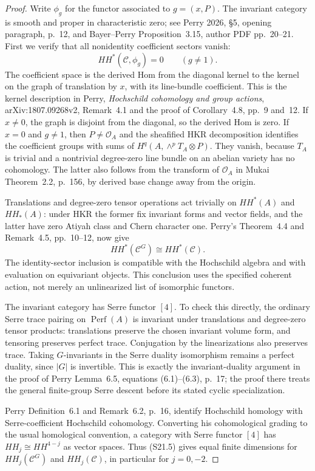 \documentclass[11pt,a4paper]{article}
\theoremstyle{definition}
\begin{document}
\begin{proof}
Write $\phi_g$ for the functor associated to $g=(x,P)$.
The invariant category is smooth and proper in characteristic
zero; see Perry 2026, \S5, opening paragraph, p.~12,
and Bayer--Perry Proposition~3.15, author PDF pp.~20--21.
First we verify that all nonidentity coefficient sectors vanish:
\[
 HH^*(\mathcal C,\phi_g)=0\qquad(g\ne1).
 \tag{S21.4}
\]
The coefficient space is the derived Hom from the diagonal
kernel to the kernel on the graph of translation by $x$,
with its line-bundle coefficient. This is the kernel
description in Perry, \emph{Hochschild cohomology and group
actions}, arXiv:1807.09268v2, Remark~4.1 and the proof of
Corollary~4.8, pp.~9 and~12. If $x\ne0$, the graph is
disjoint from the diagonal, so the derived Hom is zero.
If $x=0$ and $g\ne1$, then $P\ne\mathcal O_A$ and
the sheafified HKR decomposition identifies the coefficient
groups with sums of
$H^q(A,\wedge^pT_A\otimes P)$.
They vanish, because $T_A$ is trivial and a nontrivial
degree-zero line bundle on an abelian variety has no
cohomology. The latter also follows from the transform of
$\mathcal O_A$ in Mukai Theorem~2.2, p.~156, by derived
base change away from the origin.

Translations and degree-zero tensor operations act trivially
on $HH^*(A)$ and $HH_*(A)$: under HKR the former fix invariant
forms and vector fields, and the latter have zero Atiyah
class and Chern character one. Perry's Theorem~4.4 and
Remark~4.5, pp.~10--12, now give
\[
 HH^*(\mathcal C^G)\cong HH^*(\mathcal C).
 \tag{S21.5}
\]
The identity-sector inclusion is compatible with the
Hochschild algebra and with evaluation on equivariant objects.
This conclusion uses the specified coherent action, not
merely an unlinearized list of isomorphic functors.

The invariant category has Serre functor $[4]$.
To check this directly, the ordinary Serre trace pairing on
$\operatorname{Perf}(A)$ is invariant under translations
and degree-zero tensor products: translations preserve the
chosen invariant volume form, and tensoring preserves
perfect trace. Conjugation by the linearizations also
preserves trace. Taking $G$-invariants in the Serre duality
isomorphism remains a perfect duality, since $|G|$ is
invertible. This is exactly the invariant-duality argument
in the proof of Perry Lemma~6.5, equations (6.1)--(6.3),
p.~17; the proof there treats the general finite-group
Serre descent before its stated cyclic specialization.

Perry Definition~6.1 and Remark~6.2, p.~16, identify
Hochschild homology with Serre-coefficient Hochschild
cohomology. Converting his cohomological grading to the
usual homological convention, a category with Serre functor
$[4]$ has $HH_j\cong HH^{4-j}$ as vector spaces.
Thus (S21.5) gives equal finite dimensions for
$HH_j(\mathcal C^G)$ and $HH_j(\mathcal C)$, in particular
for $j=0,-2$.


\end{proof}
\end{document}
